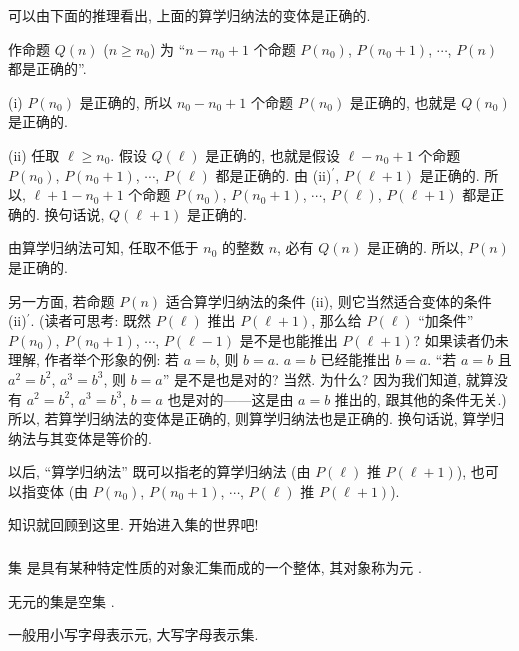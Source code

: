 \begin{remark}
    可以由下面的推理看出, 上面的算学归纳法的变体是正确的.

    作命题 $Q(n)$ ($n \geq n_0$) 为 ``$n - n_0 + 1$ 个命题 $P(n_0)$, $P(n_0 + 1)$, $\cdots$, $P(n)$ 都是正确的''.

    (i) $P(n_0)$ 是正确的, 所以 $n_0 - n_0 + 1$ 个命题 $P(n_0)$ 是正确的, 也就是 $Q(n_0)$ 是正确的.

    (ii) 任取 $\ell \geq n_0$. 假设 $Q(\ell)$ 是正确的, 也就是假设 $\ell - n_0 + 1$ 个命题 $P(n_0)$, $P(n_0 + 1)$, $\cdots$, $P(\ell)$ 都是正确的. 由 (ii)$^{\prime}$, $P(\ell + 1)$ 是正确的. 所以, $\ell + 1 - n_0 + 1$ 个命题 $P(n_0)$, $P(n_0 + 1)$, $\cdots$, $P(\ell)$, $P(\ell + 1)$ 都是正确的. 换句话说, $Q(\ell + 1)$ 是正确的.

    由算学归纳法可知, 任取不低于 $n_0$ 的整数 $n$, 必有 $Q(n)$ 是正确的. 所以, $P(n)$ 是正确的.

    另一方面, 若命题 $P(n)$ 适合算学归纳法的条件 (ii), 则它当然适合变体的条件 (ii)$^{\prime}$. (读者可思考: 既然 $P(\ell)$ 推出 $P(\ell+1)$, 那么给 $P(\ell)$ ``加条件'' $P(n_0)$, $P(n_0 + 1)$, $\cdots$, $P(\ell-1)$ 是不是也能推出 $P(\ell+1)$? 如果读者仍未理解, 作者举个形象的例: 若 $a=b$, 则 $b=a$. $a=b$ 已经能推出 $b=a$. ``若 $a=b$ 且 $a^2=b^2$, $a^3=b^3$, 则 $b=a$'' 是不是也是对的? 当然. 为什么? 因为我们知道, 就算没有 $a^2=b^2$, $a^3=b^3$, $b=a$ 也是对的——这是由 $a=b$ 推出的, 跟其他的条件无关.) 所以, 若算学归纳法的变体是正确的, 则算学归纳法也是正确的. 换句话说, 算学归纳法与其变体是等价的.

    以后, ``算学归纳法'' 既可以指老的算学归纳法 (由 $P(\ell)$ 推 $P(\ell+1)$), 也可以指变体 (由 $P(n_0)$, $P(n_0 + 1)$, $\cdots$, $P(\ell)$ 推 $P(\ell+1)$).
\end{remark}

知识就回顾到这里. 开始进入集的世界吧!

\subsubsection*{\Sets}

\begin{definition}
    集  是具有某种特定性质的对象汇集而成的一个整体, 其对象称为元 .
\end{definition}

\begin{definition}
    无元的集是空集 .
\end{definition}

\begin{remark}
    一般用小写字母表示元, 大写字母表示集.
\end{remark}

